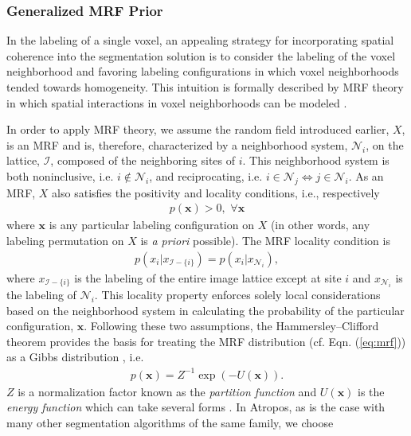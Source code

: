 \documentclass[11pt,english]{article}
\begin{document}
\subsubsection{Generalized MRF Prior}
In the labeling of a single voxel, an appealing strategy for incorporating spatial coherence into the segmentation solution is to consider the labeling of the voxel neighborhood and favoring labeling configurations in which voxel neighborhoods tended towards homogeneity. This intuition is formally described by MRF theory in which spatial interactions in voxel neighborhoods can be modeled \citep{Li2001}.

In order to apply MRF theory,  we assume the random field introduced earlier, $X$, is an MRF and is, therefore, characterized by a neighborhood system, $\mathcal{N}_i$, on the lattice, $\mathcal{I}$, composed of the neighboring sites of $i$.  This neighborhood system is both noninclusive, i.e. $i \notin \mathcal{N}_i$, and reciprocating, i.e. $i \in \mathcal{N}_j \Leftrightarrow j \in \mathcal{N}_i$.   As an MRF, $X$ also satisfies the positivity and locality conditions, i.e., respectively
\begin{align} \label{eq:mrf}
  p(\mathbf{x}) > 0, \,\, \forall\mathbf{x}
\end{align}
where $\mathbf{x}$ is any particular labeling configuration on $X$ (in
other words, any labeling permutation on $X$ is {\em a priori}
possible).  The MRF locality condition is 
\begin{align}
  p\left(x_i | x_{\mathcal{I}-\{i\}}\right) = p\left(x_i | x_{\mathcal{N}_i}\right),
\end{align}
where $x_{\mathcal{I}-\{i\}}$ is the labeling of the entire image lattice except at site $i$ and  $x_{\mathcal{N}_i}$ is the labeling of $\mathcal{N}_i$.  This locality property enforces solely local considerations based on the neighborhood system in calculating the probability of the particular configuration, $\mathbf{x}$.  Following these two assumptions, the Hammersley--Clifford theorem provides the basis for treating the MRF distribution (cf. Eqn. (\ref{eq:mrf})) as a Gibbs distribution \citep{Besag1974,Geman1984}, i.e.
\begin{align} \label{eq:gibbs}
p(\mathbf{x}) = Z^{-1} \exp\left(-U(\mathbf{x})\right).
\end{align}
$Z$ is a normalization factor known as the {\em partition function}
and $U(\mathbf{x})$ is the {\em energy function} which can take
several forms \citep{Li2001}. In Atropos, as is the case with many
other segmentation algorithms of the same family, we choose
\end{document}
